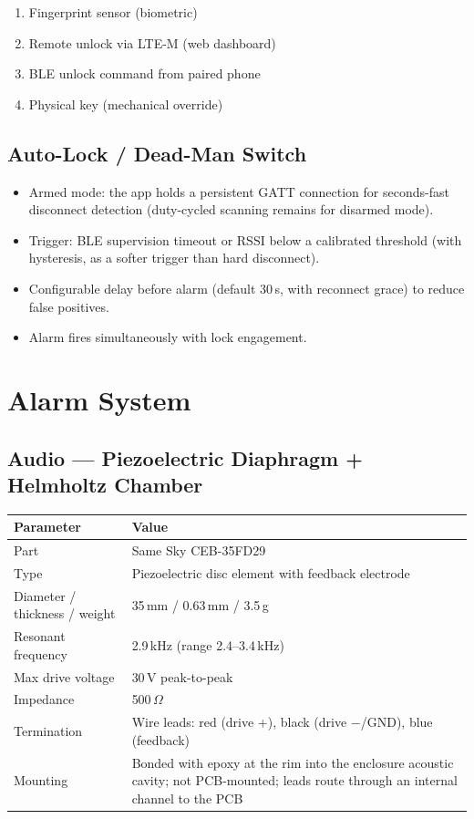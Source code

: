 \documentclass[11pt,a4paper]{article}
\begin{document}
\begin{enumerate}
  \item Fingerprint sensor (biometric)
  \item Remote unlock via LTE-M (web dashboard)
  \item BLE unlock command from paired phone
  \item Physical key (mechanical override)
\end{enumerate}

\subsection{Auto-Lock / Dead-Man Switch}

\begin{itemize}
  \item Armed mode: the app holds a persistent GATT connection for seconds-fast disconnect detection (duty-cycled scanning remains for disarmed mode).
  \item Trigger: BLE supervision timeout or RSSI below a calibrated threshold (with hysteresis, as a softer trigger than hard disconnect).
  \item Configurable delay before alarm (default 30\,s, with reconnect grace) to reduce false positives.
  \item Alarm fires simultaneously with lock engagement.
\end{itemize}

\section{Alarm System}

\subsection{Audio --- Piezoelectric Diaphragm + Helmholtz Chamber}

\begin{table}[h]
\small
\begin{tabularx}{\textwidth}{lL}
\toprule
\textbf{Parameter} & \textbf{Value}\\
\midrule
Part & Same Sky CEB-35FD29\\
Type & Piezoelectric disc element with feedback electrode\\
Diameter / thickness / weight & 35\,mm / 0.63\,mm / 3.5\,g\\
Resonant frequency & 2.9\,kHz (range 2.4--3.4\,kHz)\\
Max drive voltage & 30\,V peak-to-peak\\
Impedance & 500\,$\Omega$\\
Termination & Wire leads: red (drive +), black (drive $-$/GND), blue (feedback)\\
Mounting & Bonded with epoxy at the rim into the enclosure acoustic cavity; not PCB-mounted; leads route through an internal channel to the PCB\\
\bottomrule
\end{tabularx}
\end{table}
\end{document}
